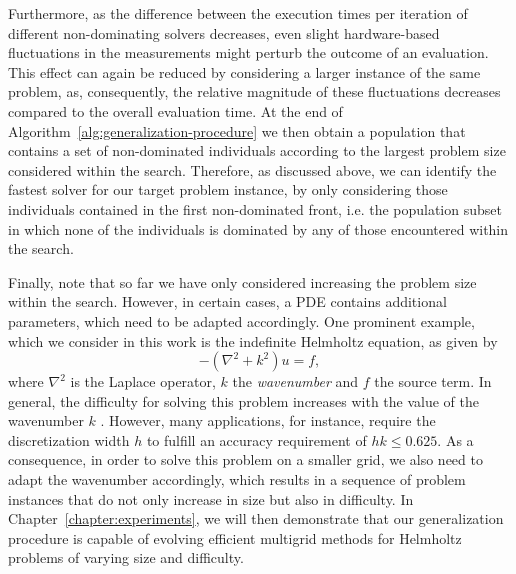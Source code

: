 Furthermore, as the difference between the execution times per iteration of different non-dominating solvers decreases, even slight hardware-based fluctuations in the measurements might perturb the outcome of an evaluation.
This effect can again be reduced by considering a larger instance of the same problem, as, consequently, the relative magnitude of these fluctuations decreases compared to the overall evaluation time.
At the end of Algorithm~\ref{alg:generalization-procedure} we then obtain a population that contains a set of non-dominated individuals according to the largest problem size considered within the search.
Therefore, as discussed above, we can identify the fastest solver for our target problem instance, by only considering those individuals contained in the first non-dominated front, i.e. the population subset in which none of the individuals is dominated by any of those encountered within the search.

Finally, note that so far we have only considered increasing the problem size within the search.
However, in certain cases, a PDE contains additional parameters, which need to be adapted accordingly.
One prominent example, which we consider in this work is the indefinite Helmholtz equation, as given by
\begin{equation}
	-(\nabla^{2} + k^{2})u = f,
	\label{eq:helmholtz}
\end{equation}
where $\nabla^{2}$ is the Laplace operator, $k$ the \emph{wavenumber} and $f$ the source term.
In general, the difficulty for solving this problem increases with the value of the wavenumber $k$ .
However, many applications, for instance, require the discretization width $h$ to fulfill an accuracy requirement of $h k \leq 0.625$. 
As a consequence, in order to solve this problem on a smaller grid, we also need to adapt the wavenumber accordingly, which results in a sequence of problem instances that do not only increase in size but also in difficulty.
In Chapter~\ref{chapter:experiments}, we will then demonstrate that our generalization procedure is capable of evolving efficient multigrid methods for Helmholtz problems of varying size and difficulty.

